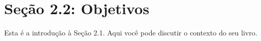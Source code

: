 \section{Seção 2.2: Objetivos}
Esta é a introdução à Seção 2.1. Aqui você pode discutir o contexto do seu livro. \cite{exemplochapter2sec2} \cite{artigo2024chapter2sec2}

\printbibliography[heading=subbibliography, title={Referências da Seção 2.1}, keyword=chapter2secao2]